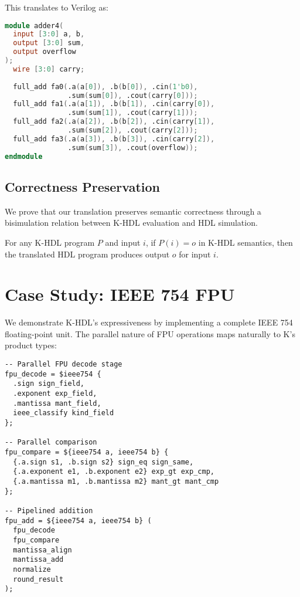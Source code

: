 \documentclass[10pt,twocolumn]{article}
\begin{document}
This translates to Verilog as:

\begin{lstlisting}[language=Verilog]
module adder4(
  input [3:0] a, b,
  output [3:0] sum,
  output overflow
);
  wire [3:0] carry;
  
  full_add fa0(.a(a[0]), .b(b[0]), .cin(1'b0),
               .sum(sum[0]), .cout(carry[0]));
  full_add fa1(.a(a[1]), .b(b[1]), .cin(carry[0]),
               .sum(sum[1]), .cout(carry[1]));
  full_add fa2(.a(a[2]), .b(b[2]), .cin(carry[1]),
               .sum(sum[2]), .cout(carry[2]));
  full_add fa3(.a(a[3]), .b(b[3]), .cin(carry[2]),
               .sum(sum[3]), .cout(overflow));
endmodule
\end{lstlisting}

\subsection{Correctness Preservation}

We prove that our translation preserves semantic correctness through a bisimulation relation between K-HDL evaluation and HDL simulation.

\begin{theorem}
For any K-HDL program $P$ and input $i$, if $P(i) = o$ in K-HDL semantics, then the translated HDL program produces output $o$ for input $i$.
\end{theorem}

\section{Case Study: IEEE 754 FPU}

We demonstrate K-HDL's expressiveness by implementing a complete IEEE 754 floating-point unit. The parallel nature of FPU operations maps naturally to K's product types:

\begin{lstlisting}
-- Parallel FPU decode stage
fpu_decode = $ieee754 {
  .sign sign_field,
  .exponent exp_field,
  .mantissa mant_field,
  ieee_classify kind_field
};

-- Parallel comparison
fpu_compare = ${ieee754 a, ieee754 b} {
  {.a.sign s1, .b.sign s2} sign_eq sign_same,
  {.a.exponent e1, .b.exponent e2} exp_gt exp_cmp,
  {.a.mantissa m1, .b.mantissa m2} mant_gt mant_cmp
};

-- Pipelined addition
fpu_add = ${ieee754 a, ieee754 b} (
  fpu_decode
  fpu_compare  
  mantissa_align
  mantissa_add
  normalize
  round_result
);
\end{lstlisting}
\end{document}
